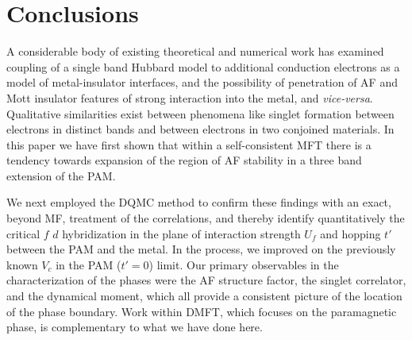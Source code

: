 \documentclass[pra,letterpaper,10pt,twocolumn]{revtex4}
\begin{document}
\vskip0.10in
\section{Conclusions}

A considerable body of existing theoretical and numerical work
\cite{potthoff95a,potthoff95b,okamoto04,zenia09,ishida12,helmes08,Euverte12}
has examined coupling of a single band Hubbard model to additional
conduction electrons as a model of metal-insulator interfaces,
and the possibility of penetration of AF and Mott insulator 
features of strong interaction into the metal, and {\it vice-versa}.
Qualitative similarities exist between phenomena like singlet
formation between electrons in distinct bands and
between electrons in two conjoined materials.
In this paper we have first shown that within a self-consistent MFT 
there is a tendency towards expansion of the region of AF stability
in a three band extension of the PAM.



We next employed the DQMC method to confirm these findings with an
exact, beyond MF, 
treatment of the correlations, and thereby identify quantitatively the
critical $f$ $d$ hybridization in the plane of interaction strength $U_f$ and
hopping $t'$ between the PAM and the metal.  In the process, we improved
on the previously known $V_c$ in the PAM ($t'=0$) limit.  Our primary
observables in the characterization of the phases were the AF structure
factor, the singlet correlator, and the dynamical moment, which all
provide a consistent picture of the location of the phase boundary.
Work within DMFT\cite{peters13}, which focuses on the paramagnetic
phase, is complementary to what we have done here.
\end{document}
